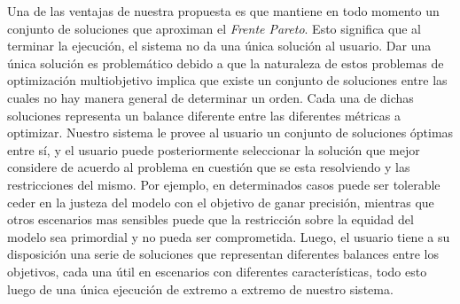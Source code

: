 Una de las ventajas de nuestra propuesta es que mantiene en todo momento un conjunto de soluciones que aproximan el \emph{Frente Pareto}.
Esto significa que al terminar la ejecución, el sistema no da una única solución al usuario.
Dar una única solución es problemático debido a que la naturaleza de estos problemas de optimización multiobjetivo implica que existe un conjunto de soluciones entre las cuales no hay manera general de determinar un orden.
Cada una de dichas soluciones representa un balance diferente entre las diferentes métricas a optimizar.
Nuestro sistema le provee al usuario un conjunto de soluciones óptimas entre sí, y el usuario puede posteriormente seleccionar la solución que mejor considere de acuerdo al problema en cuestión que se esta resolviendo y las restricciones del mismo.
Por ejemplo, en determinados casos puede ser tolerable ceder en la justeza del modelo con el objetivo de ganar precisión, mientras que otros escenarios mas sensibles puede que la restricción sobre la equidad del modelo sea primordial y no pueda ser comprometida.
Luego, el usuario tiene a su disposición una serie de soluciones que representan diferentes balances entre los objetivos, cada una útil en escenarios con diferentes características, todo esto luego de una única ejecución de extremo a extremo de nuestro sistema.

